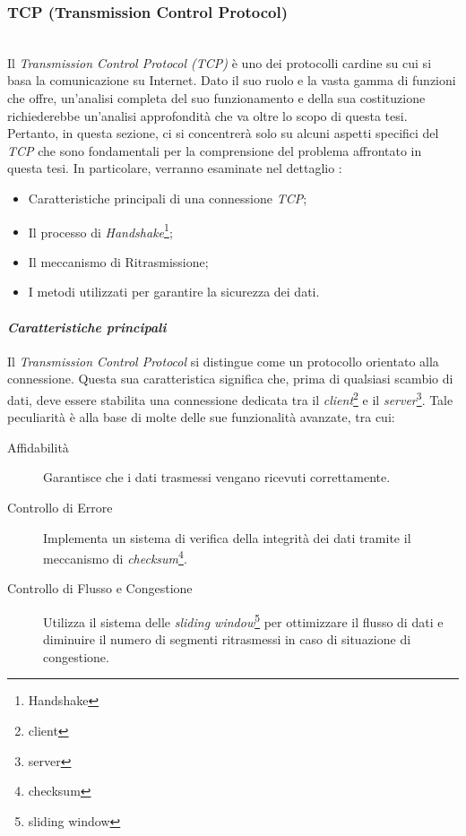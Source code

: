 \subsubsection{TCP (Transmission Control Protocol)}
~\\
\indent Il \emph{Transmission Control Protocol (TCP)} è uno dei protocolli cardine su cui si basa la comunicazione su Internet. 
Dato il suo ruolo e la vasta gamma di funzioni che offre, un'analisi completa del suo funzionamento e della sua costituzione richiederebbe un'analisi approfondità che va oltre lo scopo di questa tesi.
Pertanto, in questa sezione, ci si concentrerà solo su alcuni aspetti specifici del \emph{TCP} che sono fondamentali per la comprensione del problema affrontato in questa tesi. 
In particolare, verranno esaminate nel dettaglio :
\begin{itemize}
    \item Caratteristiche principali di una connessione \emph{TCP};
    
    \item Il processo di \emph{Handshake}\footnote{\gls{Handshake}};
    
    \item Il meccanismo di Ritrasmissione;
    
    \item I metodi utilizzati per garantire la sicurezza dei dati.
\end{itemize}

\paragraph{\textit{Caratteristiche principali}}
\noindent Il \emph{Transmission Control Protocol} si distingue come un protocollo orientato alla connessione. Questa sua caratteristica significa che, prima di qualsiasi scambio di dati, deve essere stabilita una connessione dedicata tra il \emph{client}\footnote{\gls{client}} e il \emph{server}\footnote{\gls{server}}.
Tale peculiarità è alla base di molte delle sue funzionalità avanzate, tra cui:
\begin{description}
    \item[Affidabilità] Garantisce che i dati trasmessi vengano ricevuti correttamente.

    \item[Controllo di Errore] Implementa un sistema di verifica della integrità dei dati tramite il meccanismo di \emph{checksum}\footnote{\gls{checksum}}.
    
    \item[Controllo di Flusso e Congestione] Utilizza il sistema delle \emph{sliding window}\footnote{\gls{sliding window}} per ottimizzare il flusso di dati e diminuire il numero di segmenti ritrasmessi in caso di situazione di congestione.
\end{description}

